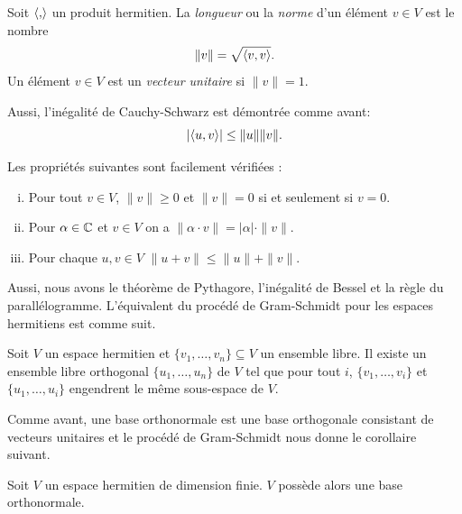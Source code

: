 \begin{definition}
  \label{def:h5}
  Soit $\langle {,} \rangle$ un produit hermitien. La \emph{longueur} ou la \emph{norme} d'un élément $v \in V$ est le nombre 
  \begin{displaymath}
    \| v \| = \sqrt{\langle {v,v} \rangle}.
  \end{displaymath}
  Un élément $v \in V$ est un \emph{vecteur unitaire} si $\|v\| = 1$. 
\end{definition}

Aussi, l'inégalité de Cauchy-Schwarz est démontrée comme avant: 
\begin{equation}
  \label{eq:6}
  | \langle {u,v} \rangle| \leq \|u\| \|v\|. 
\end{equation}


Les propriétés suivantes sont facilement vérifiées :
\begin{enumerate}[i)]
\item Pour tout $v \in V$, $\|v\|\geq 0$ et $\|v\| = 0$ si et seulement si $v = 0$. \label{item:8}
\item Pour $\alpha \in \mathbb{C}$ et $v \in V$ on a $\| \alpha \cdot v \| = |\alpha| \cdot \|v\|$. \label{item:9}
\item Pour chaque $u,v \in V$ $\|u+v\| \leq \|u\| + \|v\|$. \label{tr:2}
\end{enumerate}

Aussi, nous avons le théorème de Pythagore, l'inégalité de Bessel et la règle du parallélogramme.  
L'équivalent du procédé de Gram-Schmidt pour les espaces hermitiens est comme suit. 


\begin{theorem}
\label{thr:12}
  Soit $V$ un espace hermitien et  $\{v_1,\dots,v_n\} \subseteq V$
  un ensemble libre.  
  Il existe un ensemble libre orthogonal $\{u_1,\dots,u_n\}$
  de $V$
  tel que pour tout $i$,
  $\{v_1,\dots,v_i\}$
  et $\{u_1,\dots,u_i\}$ engendrent le même sous-espace de $V$.
\end{theorem}

Comme avant, une base orthonormale est une base orthogonale consistant
de vecteurs unitaires et le procédé de Gram-Schmidt nous donne le
corollaire suivant.

\begin{corollary}
  \label{co:6}
  Soit $V$
  un espace hermitien de dimension finie.  $V$
  possède alors une base orthonormale.
\end{corollary}



